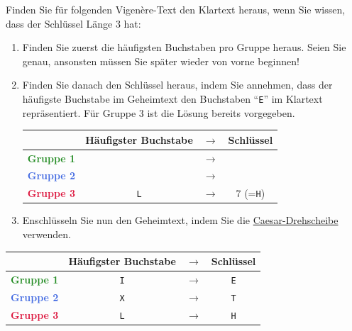 \setcounter{chapter}{1}
\lstset{style=Python}

\begin{myexercise}\label{ex:vigHaufigkeitGruppen}
Finden Sie für folgenden Vigenère-Text den Klartext heraus, wenn Sie wissen, dass der Schlüssel Länge 3 hat:


\begin{enumerate}
\item Finden Sie zuerst die häufigsten Buchstaben pro Gruppe heraus. Seien Sie genau, ansonsten müssen Sie später wieder von vorne beginnen!
\item Finden Sie danach den Schlüssel heraus, indem Sie annehmen, dass der häufigste Buchstabe im Geheimtext den Buchstaben \enquote{\texttt{E}} im Klartext repräsentiert. Für Gruppe 3 ist die Lösung bereits vorgegeben.
\begin{table}[H]
\centering
\begin{tabular}{cccc}
&\textbf{Häufigster Buchstabe} & $\rightarrow$ & \textbf{Schlüssel}\\\midrule\midrule
\textbf{\textcolor{ForestGreen}{Gruppe 1}}&&$\rightarrow$&\\\midrule
\textbf{\textcolor{RoyalBlue}{Gruppe 2}}&&$\rightarrow$&\\\midrule
\textbf{\textcolor{Crimson}{Gruppe 3}}&\texttt{L}&$\rightarrow$&7 (=\texttt{H})\\\midrule
\end{tabular}
\end{table}
\item Enschlüsseln Sie nun den Geheimtext, indem Sie die \href{https://naokipeter.gitlab.io/caesar/}{Caesar-Drehscheibe} verwenden.
\end{enumerate}

\begin{myanswer}
\begin{table}[H]
\centering
\begin{tabular}{cccc}
&\textbf{Häufigster Buchstabe} & $\rightarrow$ & \textbf{Schlüssel}\\\midrule\midrule
\textbf{\textcolor{ForestGreen}{Gruppe 1}}&\texttt{I}&$\rightarrow$&\texttt{E}\\\midrule
\textbf{\textcolor{RoyalBlue}{Gruppe 2}}&\texttt{X}&$\rightarrow$&\texttt{T}\\\midrule
\textbf{\textcolor{Crimson}{Gruppe 3}}&\texttt{L}&$\rightarrow$&\texttt{H}\\\midrule
\end{tabular}
\end{table}


\end{myanswer}
\end{myexercise}
